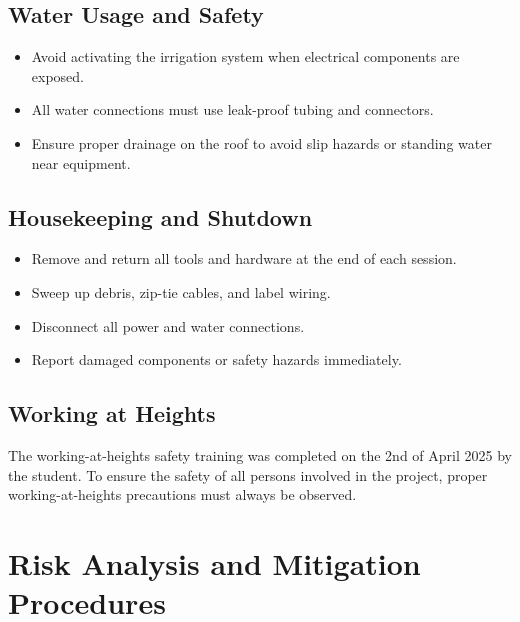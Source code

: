 \subsection{Water Usage and Safety}
\begin{itemize}
	\item Avoid activating the irrigation system when electrical components are exposed.
	\item All water connections must use leak-proof tubing and connectors.
	\item Ensure proper drainage on the roof to avoid slip hazards or standing water near equipment.
\end{itemize}

\subsection{Housekeeping and Shutdown}
\begin{itemize}
	\item Remove and return all tools and hardware at the end of each session.
	\item Sweep up debris, zip-tie cables, and label wiring.
	\item Disconnect all power and water connections.
	\item Report damaged components or safety hazards immediately.
\end{itemize}

\subsection{Working at Heights}
The working-at-heights safety training was completed on the 2nd of April 2025 by the student. To ensure the safety of all persons involved in the project, proper working-at-heights precautions must always be observed.


\section{Risk Analysis and Mitigation Procedures}

